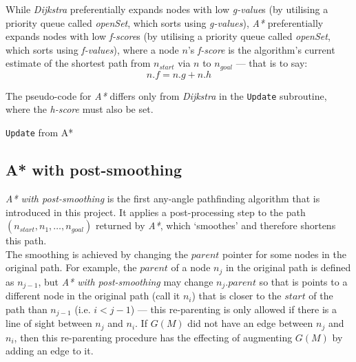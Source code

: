 \documentclass[12pt,notitlepage]{report}
\begin{document}
\noindent
While {\em Dijkstra} preferentially expands nodes with low {\em g-value}s (by utilising a priority queue called {\em openSet}, which sorts using {\em g-values}), {\em A*} preferentially expands nodes with low {\em f-score}s (by utilising a priority queue called {\em openSet}, which sorts using {\em f-values}), where a node $n$'s {\em f-score} is the algorithm's current estimate of the shortest path from $n_{start}$ via $n$ to $n_{goal}$ --- that is to say:
\begin{equation}
n.f = n.g + n.h
\end{equation}

\noindent
The pseudo-code for {\em A*} differs only from {\em Dijkstra} in the {\tt Update} subroutine, where the {\em h-score} must also be set.

\begin{algorithm}
  \SetAlgoLined\DontPrintSemicolon
  \caption{{\tt Update} from {\sc A*}}
\end{algorithm} 

\subsection {A* with post-smoothing}

{\em A* with post-smoothing} is the first any-angle pathfinding algorithm that is introduced in this project. It applies a post-processing step to the path $(n_{start}, n_{1}, \ldots, n_{goal})$ returned by {\em A*}, which `smoothes'  and therefore shortens this path.\\

\noindent The smoothing is achieved by changing the $parent$ pointer for some nodes in the original path. For example, the $parent$ of a node $n_{j}$ in the original path is defined as $n_{j-1}$, but {\em A* with post-smoothing} may change $n_{j}.parent$ so that is points to a different node in the original path (call it $n_{i}$) that is closer to the $start$ of the path than $n_{j-1}$ (i.e. $i<j-1$) --- this re-parenting is only allowed if there is a line of sight between $n_{j}$ and $n_{i}$. If $G(M)$ did not have an edge between $n_{j}$ and $n_{i}$, then this re-parenting procedure has the effecting of augmenting $G(M)$ by adding an edge to it.\\
\end{document}
